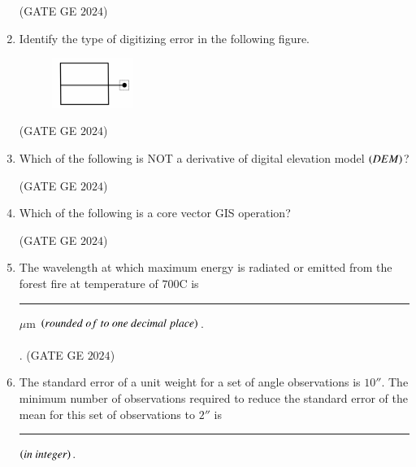 \documentclass[journal,12pt,onecolumn]{IEEEtran}
\theoremstyle{remark}
\begin{document}
\begin{enumerate}
\begin{enumerate}
\end{enumerate}
\hfill{(GATE GE $2024$)}
\bigskip
\item Identify the type of digitizing error in the following figure.
\\
\begin{figure}[h!]
    \centering
    \includegraphics[width=0.25\textwidth]{figs/fig4.png}
\end{figure}

\begin{enumerate}
\end{enumerate}
\hfill{(GATE GE $2024$)}
\bigskip
\item Which of the following is NOT a derivative of digital elevation model $\left(DEM\right)$?
\begin{enumerate}
\end{enumerate}
\hfill{(GATE GE $2024$)}
\bigskip
\item Which of the following is a core vector GIS operation?
\begin{enumerate}
\end{enumerate}
\hfill{(GATE GE $2024$)}
\bigskip
\item The wavelength at which maximum energy is radiated or emitted from the forest fire at temperature of $700$\degree C is \rule{2cm}{0.5mm} $\mu$m $\brak{rounded\ of\ to\ one\ decimal\ place}$.
\\
\\.
\hfill{(GATE GE $2024$)}
\bigskip

\item The standard error of a unit weight for a set of angle observations is $10''$.
The minimum number of observations required to reduce the standard error of the mean for this set of observations to $2''$ is \rule{2cm}{0.5mm} $\left(in\ integer\right)$.\\
\end{enumerate}
\end{document}
